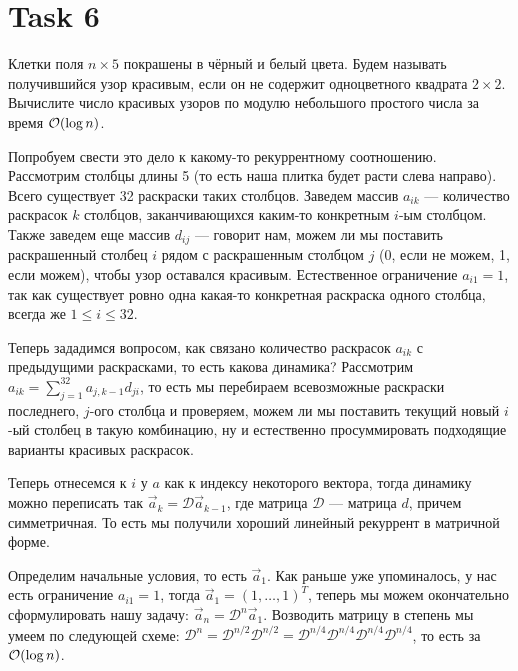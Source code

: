 \section{Task 6}
\begin{task}
    Клетки поля $n \times 5$ покрашены в чёрный и белый цвета. Будем называть получившийся узор красивым, если он не содержит одноцветного квадрата $2 \times 2$. Вычислите число красивых узоров по модулю небольшого простого числа за время $\mathcal{O}(\log n)$.
\end{task}

\begin{solution}
    Попробуем свести это дело к какому-то рекуррентному соотношению.
    Рассмотрим столбцы длины 5 (то есть наша плитка будет расти слева направо). Всего существует 32 раскраски таких столбцов. Заведем массив $a_{ik}$ --- количество раскрасок $k$ столбцов, заканчивающихся каким-то конкретным $i$-ым столбцом. Также заведем еще массив $d_{ij}$ --- говорит нам, можем ли мы поставить раскрашенный столбец $i$ рядом с раскрашенным столбцом $j$ (0, если не можем, 1, если можем), чтобы узор оставался красивым. Естественное ограничение $a_{i1} = 1$, так как существует ровно одна какая-то конкретная раскраска одного столбца, всегда же $1 \leq i \leq 32$.
    
    Теперь зададимся вопросом, как связано количество раскрасок $a_{ik}$ с предыдущими раскрасками, то есть какова динамика?
    Рассмотрим $a_{ik} = \sum\limits_{j=1}^{32}a_{j,k-1}d_{ji}$, то есть мы перебираем всевозможные раскраски последнего, $j$-ого столбца и проверяем, можем ли мы поставить текущий новый $i$-ый столбец в такую комбинацию, ну и естественно просуммировать подходящие варианты красивых раскрасок.

    Теперь отнесемся к $i$ у $a$ как к индексу некоторого вектора, тогда динамику можно переписать так $\vec{a}_k = \mathcal{D}\vec{a}_{k-1}$, где матрица $\mathcal{D}$ --- матрица $d$, причем симметричная.
    То есть мы получили хороший линейный рекуррент в матричной форме.
    
    Определим начальные условия, то есть $\vec{a}_1$. Как раньше уже упоминалось, у нас есть ограничение $a_{i1} = 1$, тогда $\vec{a}_1 = (1,\ldots,1)^T$, теперь мы можем окончательно сформулировать нашу задачу:
    $\vec{a}_n = \mathcal{D}^n\vec{a}_1$. Возводить матрицу в степень мы умеем по следующей схеме: $\mathcal{D}^n = \mathcal{D}^{n/2}\mathcal{D}^{n/2} = \mathcal{D}^{n/4}\mathcal{D}^{n/4}\mathcal{D}^{n/4}\mathcal{D}^{n/4}$, то есть за $\mathcal{O}(\log n)$.
\end{solution}